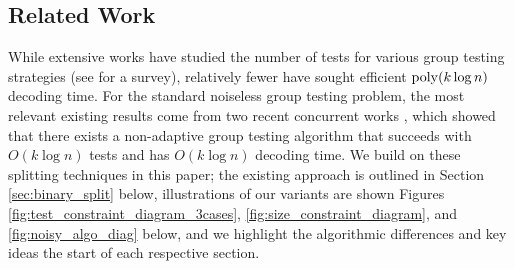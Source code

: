 \subsection{Related Work}

While extensive works have studied the number of tests for various group testing strategies (see \cite{Ald19} for a survey), relatively fewer have sought efficient ${\rm poly}(k \log n)$ decoding time.  For the standard noiseless group testing problem, the most relevant existing results come from two recent concurrent works \cite{cher20,Eri20}, which showed that there exists a non-adaptive group testing algorithm that succeeds with $O(k\log n)$ tests and has $O(k\log n)$ decoding time. We build on these splitting techniques in this paper; the existing approach is outlined in Section \ref{sec:binary_split} below, illustrations of our variants are shown Figures \ref{fig:test_constraint_diagram_3cases}, \ref{fig:size_constraint_diagram}, and \ref{fig:noisy_algo_diag} below, and we highlight the algorithmic differences and key ideas the start of each respective section.

